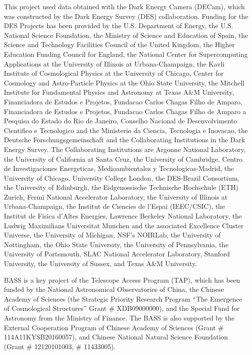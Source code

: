 \documentclass[twocolumn,tighten]{aastex631}
\begin{document}
\begin{CJK*}{UTF8}{gbsn}
This project used data obtained with the Dark Energy Camera (DECam), which was constructed by the Dark Energy Survey (DES) collaboration. Funding for the DES Projects has been provided by the U.S. Department of Energy, the U.S. National Science Foundation, the Ministry of Science and Education of Spain, the Science and Technology Facilities Council of the United Kingdom, the Higher Education Funding Council for England, the National Center for Supercomputing Applications at the University of Illinois at Urbana-Champaign, the Kavli Institute of Cosmological Physics at the University of Chicago, Center for Cosmology and Astro-Particle Physics at the Ohio State University, the Mitchell Institute for Fundamental Physics and Astronomy at Texas A\&M University, Financiadora de Estudos e Projetos, Fundacao Carlos Chagas Filho de Amparo, Financiadora de Estudos e Projetos, Fundacao Carlos Chagas Filho de Amparo a Pesquisa do Estado do Rio de Janeiro, Conselho Nacional de Desenvolvimento Cientifico e Tecnologico and the Ministerio da Ciencia, Tecnologia e Inovacao, the Deutsche Forschungsgemeinschaft and the Collaborating Institutions in the Dark Energy Survey. The Collaborating Institutions are Argonne National Laboratory, the University of California at Santa Cruz, the University of Cambridge, Centro de Investigaciones Energeticas, Medioambientales y Tecnologicas-Madrid, the University of Chicago, University College London, the DES-Brazil Consortium, the University of Edinburgh, the Eidgenossische Technische Hochschule (ETH) Zurich, Fermi National Accelerator Laboratory, the University of Illinois at Urbana-Champaign, the Institut de Ciencies de l'Espai (IEEC/CSIC), the Institut de Fisica d'Altes Energies, Lawrence Berkeley National Laboratory, the Ludwig Maximilians Universitat Munchen and the associated Excellence Cluster Universe, the University of Michigan, NSF's NOIRLab, the University of Nottingham, the Ohio State University, the University of Pennsylvania, the University of Portsmouth, SLAC National Accelerator Laboratory, Stanford University, the University of Sussex, and Texas A\&M University.

BASS is a key project of the Telescope Access Program (TAP), which has been funded by the National Astronomical Observatories of China, the Chinese Academy of Sciences (the Strategic Priority Research Program “The Emergence of Cosmological Structures” Grant \# XDB09000000), and the Special Fund for Astronomy from the Ministry of Finance. The BASS is also supported by the External Cooperation Program of Chinese Academy of Sciences (Grant \# 114A11KYSB20160057), and Chinese National Natural Science Foundation (Grant \# 12120101003, \# 11433005).


\end{CJK*}
\end{document}
